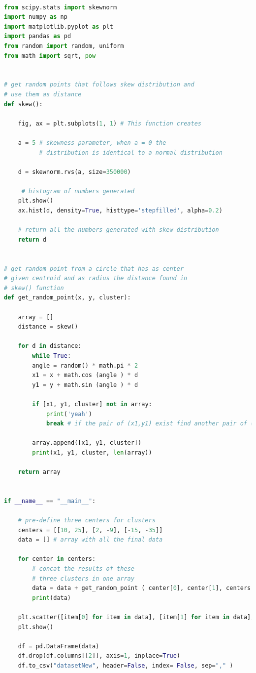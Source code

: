 \HRule \\[0.2cm] %
\begin{lstlisting}[language=Python]
from scipy.stats import skewnorm
import numpy as np
import matplotlib.pyplot as plt
import pandas as pd
from random import random, uniform
from math import sqrt, pow


# get random points that follows skew distribution and 
# use them as distance
def skew():

	fig, ax = plt.subplots(1, 1) # This function creates 					 # a figure and a grid of subplots

	a = 5 # skewness parameter, when a = 0 the 		 
	      # distribution is identical to a normal distribution
	
	d = skewnorm.rvs(a, size=350000)
	
	 # histogram of numbers generated
	plt.show()
	ax.hist(d, density=True, histtype='stepfilled', alpha=0.2)

	# return all the numbers generated with skew distribution
	return d 


# get random point from a circle that has as center 
# given centroid and as radius the distance found in 
# skew() function
def get_random_point(x, y, cluster):

	array = []
	distance = skew()
	
	for d in distance:
		while True:
		angle = random() * math.pi * 2
		x1 = x + math.cos (angle ) * d
		y1 = y + math.sin (angle ) * d
		
		if [x1, y1, cluster] not in array:
			print('yeah')
			break # if the pair of (x1,y1) exist find another pair of (x1,y1)
		
		array.append([x1, y1, cluster])
		print(x1, y1, cluster, len(array))
		
	return array


if __name__ == "__main__":
	
	# pre-define three centers for clusters
	centers = [[10, 25], [2, -9], [-15, -35]]
	data = [] # array with all the final data
	
	for center in centers:
		# concat the results of these
		# three clusters in one array
		data = data + get_random_point ( center[0], center[1], centers.index(center)) print(len(data))
		print(data)
	
	plt.scatter([item[0] for item in data], [item[1] for item in data], c=[item[2] for item in data])
	plt.show()
	
	df = pd.DataFrame(data)
	df.drop(df.columns[[2]], axis=1, inplace=True)
	df.to_csv("datasetNew", header=False, index= False, sep="," )

\end{lstlisting}
\newpage
